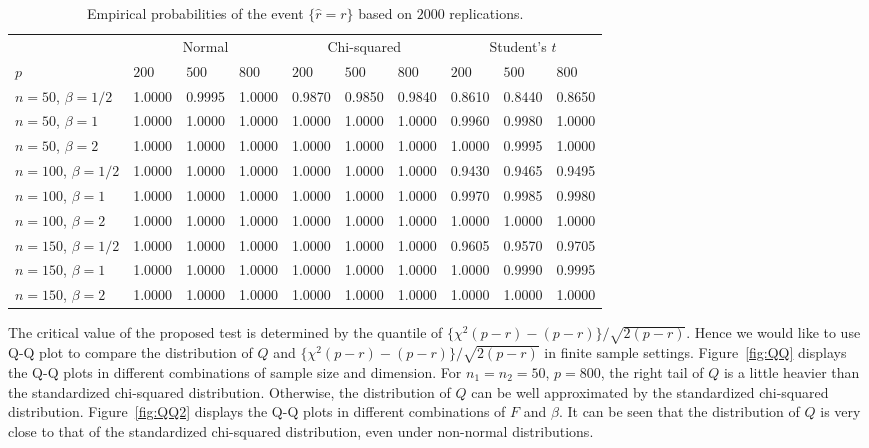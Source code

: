\documentclass[times,sort&compress,3p]{elsarticle}
\theoremstyle{plain}
\theoremstyle{definition}
\theoremstyle{remark}
\begin{document}
\begin{table}[ht]
    \caption{Empirical probabilities of the event $\{\hat{r}=r\}$ based on $2000$ replications.} 
\label{newnewtable}
\vspace{3mm}
\centering
\begin{tabular}{llllllllll}
\toprule
    &   \multicolumn{3}{c}{Normal} & \multicolumn{3}{c}{Chi-squared}& \multicolumn{3}{c}{Student's $t$}  \\
    \cmidrule(r){2-4}
\cmidrule(r){5-7}
\cmidrule(r){8-10}
    $p$ & $200$ &  $500$ & $800$ & $200$  & $500$ & $800$ & $200$ & $500$ & $800$ \\ 
\midrule
    $n=50$, $\beta=1/2$ & 1.0000 & 0.9995& 1.0000 &0.9870&0.9850&0.9840&0.8610&0.8440&0.8650\\
    $n=50$, $\beta=1$ & 1.0000 & 1.0000 & 1.0000 & 1.0000 & 1.0000 & 1.0000 & 0.9960 & 0.9980 & 1.0000\\
    $n=50$, $\beta=2$ & 1.0000 & 1.0000 & 1.0000 & 1.0000 & 1.0000 & 1.0000 & 1.0000 & 0.9995 & 1.0000\\
    \midrule
    $n=100$, $\beta=1/2$ & 1.0000 & 1.0000 & 1.0000 & 1.0000 & 1.0000 & 1.0000 & 0.9430 & 0.9465 & 0.9495 \\
    $n=100$, $\beta=1$ & 1.0000 & 1.0000 & 1.0000 & 1.0000 & 1.0000 & 1.0000 & 0.9970 & 0.9985 & 0.9980\\
    $n=100$, $\beta=2$ & 1.0000 & 1.0000 & 1.0000 & 1.0000 & 1.0000 & 1.0000  & 1.0000 & 1.0000 & 1.0000\\
    \midrule
    $n=150$, $\beta=1/2$ & 1.0000 & 1.0000 & 1.0000 & 1.0000 & 1.0000 & 1.0000 & 0.9605 & 0.9570 & 0.9705 \\
    $n=150$, $\beta=1$ & 1.0000 & 1.0000 & 1.0000 & 1.0000 & 1.0000 & 1.0000 & 1.0000 & 0.9990 & 0.9995 \\
    $n=150$, $\beta=2$ & 1.0000 & 1.0000 & 1.0000 & 1.0000 & 1.0000 & 1.0000 & 1.0000 & 1.0000 & 1.0000 \\
\bottomrule
\end{tabular}
\end{table}








The critical value of the proposed test is determined by the quantile of $\{\chi^2(p-r)-(p-r)\}/\sqrt{2(p-r)}$.
Hence we would like to use Q-Q plot to compare the distribution of $Q$ and $\{\chi^2(p-r)-(p-r)\}/\sqrt{2(p-r)}$ in finite sample settings.
Figure~\ref{fig:QQ} displays the Q-Q plots in different combinations of sample size and dimension.
For $n_1=n_2=50$, $p=800$, the right tail of $Q$ is a little heavier than the standardized chi-squared distribution.
Otherwise, the distribution of $Q$ can be well approximated by the standardized chi-squared distribution.
Figure~\ref{fig:QQ2} displays the Q-Q plots in different combinations of $F$ and $\beta$.
It can be seen that the distribution of $Q$ is very close to that of the standardized chi-squared distribution, even under non-normal distributions.
\end{document}
